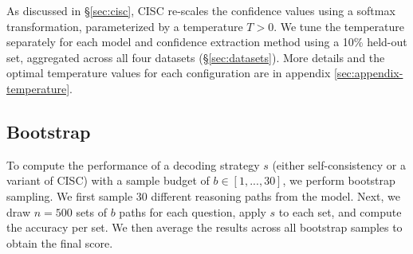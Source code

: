 As discussed in \S\ref{sec:cisc}, CISC re-scales the confidence values using a softmax transformation, parameterized by a temperature $T > 0$. We tune the temperature separately for each model and confidence extraction method using a 10\% held-out set, aggregated across all four datasets (\S\ref{sec:datasets}). More details and the optimal temperature values for each configuration are in appendix \ref{sec:appendix-temperature}.

\subsection{Bootstrap}
\label{sec:bootstrap}

To compute the performance of a decoding strategy $s$ (either self-consistency or a variant of CISC) with a sample budget of $b \in [1,...,30]$, we perform bootstrap sampling. We first sample $30$ different reasoning paths from the model. 
Next, we draw $n=500$ sets of $b$ paths for each question, apply $s$ to each set, and compute the accuracy per set. We then average the results across all bootstrap samples to obtain the final score.
